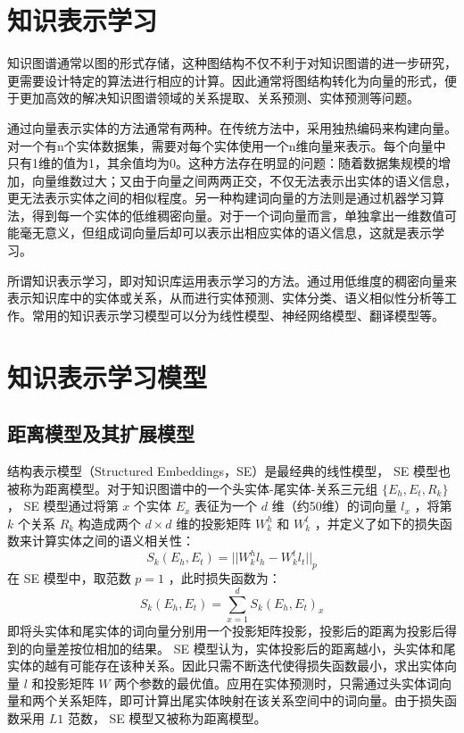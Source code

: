 \documentclass{llncs}
\begin{document}
\section{知识表示学习}

知识图谱通常以图的形式存储，这种图结构不仅不利于对知识图谱的进一步研究，更需要设计特定的算法进行相应的计算。因此通常将图结构转化为向量的形式，便于更加高效的解决知识图谱领域的关系提取、关系预测、实体预测等问题。

通过向量表示实体的方法通常有两种。在传统方法中，采用独热编码来构建向量。对一个有n个实体数据集，需要对每个实体使用一个n维向量来表示。每个向量中只有1维的值为1，其余值均为0。这种方法存在明显的问题：随着数据集规模的增加，向量维数过大；又由于向量之间两两正交，不仅无法表示出实体的语义信息，更无法表示实体之间的相似程度。另一种构建词向量的方法则是通过机器学习算法，得到每一个实体的低维稠密向量。对于一个词向量而言，单独拿出一维数值可能毫无意义，但组成词向量后却可以表示出相应实体的语义信息，这就是表示学习。

所谓知识表示学习，即对知识库运用表示学习的方法。通过用低维度的稠密向量来表示知识库中的实体或关系，从而进行实体预测、实体分类、语义相似性分析等工作。常用的知识表示学习模型可以分为线性模型、神经网络模型、翻译模型等。

\section{知识表示学习模型}

\subsection{距离模型及其扩展模型}

结构表示模型（Structured Embeddings，SE）\cite{DBLP:conf/aaai/BordesWCB11}是最经典的线性模型， SE 模型也被称为距离模型。对于知识图谱中的一个头实体-尾实体-关系三元组 $\{E_h, E_t, R_k\}$ ， SE 模型通过将第 $x$ 个实体 $E_x$ 表征为一个 $d$ 维（约50维）的词向量 $l_x$ ，将第 $k$ 个关系 $R_k$ 构造成两个 $d×d$ 维的投影矩阵 $W^h_k$ 和 $W^t_k$ ，并定义了如下的损失函数来计算实体之间的语义相关性：
\begin{displaymath}
S_k(E_h,E_t)=||W^h_kl_h-W^t_kl_t||_p
\end{displaymath}
在 SE 模型中，取范数 $p=1$ ，此时损失函数为：
\begin{displaymath}
S_k(E_h,E_t)=\sum_{x=1}^d{S_k(E_h,E_t)_x}
\end{displaymath}
即将头实体和尾实体的词向量分别用一个投影矩阵投影，投影后的距离为投影后得到的向量差按位相加的结果。 SE 模型认为，实体投影后的距离越小，头实体和尾实体的越有可能存在该种关系。因此只需不断迭代使得损失函数最小，求出实体向量 $l$ 和投影矩阵 $W$ 两个参数的最优值。应用在实体预测时，只需通过头实体词向量和两个关系矩阵，即可计算出尾实体映射在该关系空间中的词向量。由于损失函数采用 $L1$ 范数， SE 模型又被称为距离模型。
\end{document}
